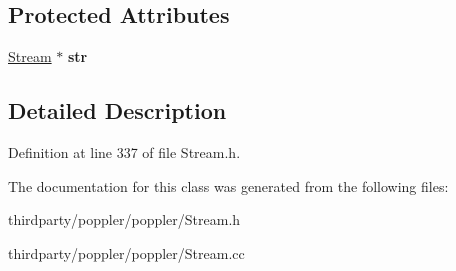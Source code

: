 \subsection*{Protected Attributes}
\begin{DoxyCompactItemize}
\item 
\mbox{\label{class_filter_stream_a78e4b67915c45892909aa26ffb9f3435}} 
\hyperlink{class_stream}{Stream} $\ast$ {\bfseries str}
\end{DoxyCompactItemize}


\subsection{Detailed Description}


Definition at line 337 of file Stream.\+h.



The documentation for this class was generated from the following files\+:\begin{DoxyCompactItemize}
\item 
thirdparty/poppler/poppler/Stream.\+h\item 
thirdparty/poppler/poppler/Stream.\+cc\end{DoxyCompactItemize}
